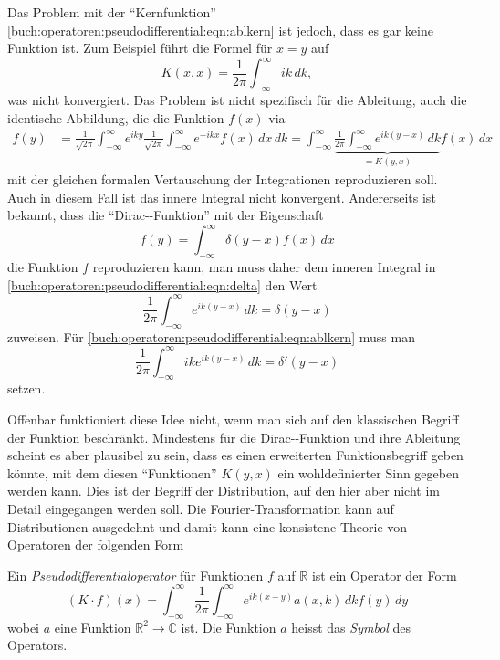 Das Problem mit der ``Kernfunktion''
\eqref{buch:operatoren:pseudodifferential:eqn:ablkern}
ist jedoch, dass es gar keine Funktion ist.
Zum Beispiel führt die Formel für $x=y$ auf
\[
K(x,x)
=
\frac{1}{2\pi}
\int_{-\infty}^\infty 
ik\,dk,
\]
was nicht konvergiert.
Das Problem ist nicht spezifisch für die Ableitung, auch die identische
Abbildung, die die Funktion $f(x)$ via
\begin{align}
f(y)
&=
\frac{1}{\!\sqrt{2\pi}}
\int_{-\infty}^\infty
e^{iky}
\frac{1}{\!\sqrt{2\pi}}
\int_{-\infty}^\infty
e^{-ikx}
f(x)
\,dx
\,dk
=
\int_{-\infty}^\infty
\underbrace{
\frac{1}{2\pi}
\int_{-\infty}^\infty
e^{ik(y-x)}
\,dk
}_{\displaystyle = K(y,x)}
f(x)
\,dx
\label{buch:operatoren:pseudodifferential:eqn:delta}
\end{align}
mit der gleichen formalen Vertauschung der Integrationen reproduzieren
soll.
Auch in diesem Fall ist das innere Integral nicht konvergent.
Andererseits ist bekannt, dass die ``Dirac-\textdelta-Funktion'' 
mit der Eigenschaft
\[
f(y) = \int_{-\infty}^\infty \delta(y-x) f(x)\,dx
\]
die Funktion $f$ reproduzieren kann, man muss daher dem inneren
Integral in \eqref{buch:operatoren:pseudodifferential:eqn:delta} den
Wert
\[
\frac{1}{2\pi}
\int_{-\infty}^\infty e^{ik(y-x)} \,dk
=
\delta (y-x)
\]
zuweisen.
Für
\eqref{buch:operatoren:pseudodifferential:eqn:ablkern}
muss man
\[
\frac{1}{2\pi}
\int_{-\infty}^\infty ike^{ik(y-x)} \,dk
=
\delta'(y-x)
\]
setzen.

Offenbar funktioniert diese Idee nicht, wenn man sich auf den 
klassischen Begriff der Funktion beschränkt.
Mindestens für die Dirac-\textdelta-Funktion und ihre Ableitung
scheint es aber plausibel zu sein, dass es einen erweiterten
Funktionsbegriff geben könnte, mit dem diesen ``Funktionen'' $K(y,x)$
ein wohldefinierter Sinn gegeben werden kann.
Dies ist der Begriff der Distribution, auf den hier aber nicht
im Detail eingegangen werden soll.
Die Fourier-Transformation kann auf Distributionen ausgedehnt und
damit kann eine konsistene Theorie von Operatoren der folgenden Form

\begin{definition}
Ein {\em Pseudodifferentialoperator} für Funktionen $f$ auf $\mathbb{R}$ ist
ein Operator der Form
\[
(K\cdot f)(x)
=
\int_{-\infty}^\infty
\frac{1}{2\pi}
\int_{-\infty}^\infty
e^{ik(x-y)}
a(x,k)
\,dk
f(y)\,dy
\]
wobei $a$ eine Funktion $\mathbb{R}^2\to\mathbb{C}$ ist.
Die Funktion $a$ heisst das {\em Symbol} des Operators.
\end{definition}


